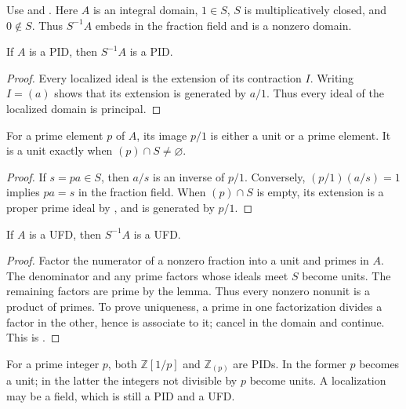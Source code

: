 Use 
and .
Here $A$ is an integral domain, $1\in S$, $S$ is multiplicatively closed,
and $0\notin S$. Thus $S^{-1}A$ embeds in the fraction field and is a
nonzero domain.

\begin{proposition}\label{pid-localization}
If $A$ is a PID, then $S^{-1}A$ is a PID.
\end{proposition}
\begin{proof}\label{pid-localization-proof}
Every localized ideal is the extension of its contraction $I$.
Writing $I=(a)$ shows that its extension is generated by $a/1$.
Thus every ideal of the localized domain is principal.
\end{proof}
\begin{lemma}\label{prime-localization}
For a prime element $p$ of $A$, its image $p/1$ is either a unit or
a prime element. It is a unit exactly when $(p)\cap S\ne\varnothing$.
\end{lemma}
\begin{proof}\label{prime-localization-proof}
If $s=pa\in S$, then $a/s$ is an inverse of $p/1$.
Conversely, $(p/1)(a/s)=1$ implies $pa=s$ in the fraction field.
When $(p)\cap S$ is empty, its extension is a proper prime ideal by
, and is generated by $p/1$.
\end{proof}
\begin{theorem}\label{ufd-localization}
If $A$ is a UFD, then $S^{-1}A$ is a UFD.
\end{theorem}
\begin{proof}\label{ufd-localization-proof}
Factor the numerator of a nonzero fraction into a unit and primes in $A$.
The denominator and any prime factors whose ideals meet $S$ become units.
The remaining factors are prime by the lemma. Thus every nonzero
nonunit is a product of primes. To prove uniqueness, a prime in one
factorization divides a factor in the other, hence is associate to it;
cancel in the domain and continue. This is
.
\end{proof}
\begin{example}\label{integer-localizations}
For a prime integer $p$, both $\mathbb Z[1/p]$ and $\mathbb Z_{(p)}$
are PIDs. In the former $p$ becomes a unit; in the latter the integers
not divisible by $p$ become units. A localization may be a field,
which is still a PID and a UFD.
\end{example}
